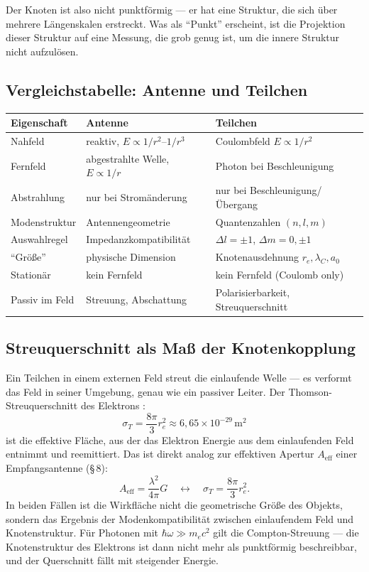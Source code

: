 Der Knoten ist also nicht punktförmig --- er hat eine Struktur, die
sich über mehrere Längenskalen erstreckt. Was als ``Punkt'' erscheint,
ist die Projektion dieser Struktur auf eine Messung, die grob genug
ist, um die innere Struktur nicht aufzulösen.

\subsection*{Vergleichstabelle: Antenne und Teilchen}

\begin{center}
\begin{tabular}{@{}lp{2.4cm}p{2.4cm}@{}}
\toprule
\textbf{Eigenschaft} & \textbf{Antenne} & \textbf{Teilchen} \\
\midrule
Nahfeld & reaktiv, $E\propto 1/r^2$--$1/r^3$ & Coulombfeld $E\propto 1/r^2$ \\
Fernfeld & abgestrahlte Welle, $E\propto 1/r$ & Photon bei Beschleunigung \\
Abstrahlung & nur bei Stromänderung & nur bei Beschleunigung/Übergang \\
Modenstruktur & Antennengeometrie & Quantenzahlen $(n,l,m)$ \\
Auswahlregel & Impedanzkompatibilität & $\Delta l=\pm1$, $\Delta m=0,\pm1$ \\
``Größe'' & physische Dimension & Knotenausdehnung $r_e,\lambda_C,a_0$ \\
Stationär & kein Fernfeld & kein Fernfeld (Coulomb only) \\
Passiv im Feld & Streuung, Abschattung & Polarisierbarkeit, Streuquerschnitt \\
\bottomrule
\end{tabular}
\end{center}

\subsection*{Streuquerschnitt als Maß der Knotenkopplung}

Ein Teilchen in einem externen Feld streut die einlaufende Welle ---
es verformt das Feld in seiner Umgebung, genau wie ein passiver Leiter.
Der Thomson-Streuquerschnitt des Elektrons \cite{Jackson1999}:
\[
  \sigma_T = \frac{8\pi}{3}r_e^2 \approx 6{,}65\times 10^{-29}\,\mathrm{m}^2
\]
ist die effektive Fläche, aus der das Elektron Energie aus dem
einlaufenden Feld entnimmt und reemittiert. Das ist direkt analog zur
effektiven Apertur $A_\mathrm{eff}$ einer Empfangsantenne (§\,8):
\[
  A_\mathrm{eff} = \frac{\lambda^2}{4\pi}G
  \quad \longleftrightarrow \quad
  \sigma_T = \frac{8\pi}{3}r_e^2.
\]
In beiden Fällen ist die Wirkfläche nicht die geometrische Größe des
Objekts, sondern das Ergebnis der Modenkompatibilität zwischen
einlaufendem Feld und Knotenstruktur. Für Photonen mit $\hbar\omega
\gg m_e c^2$ gilt die Compton-Streuung --- die Knotenstruktur des
Elektrons ist dann nicht mehr als punktförmig beschreibbar, und der
Querschnitt fällt mit steigender Energie.

